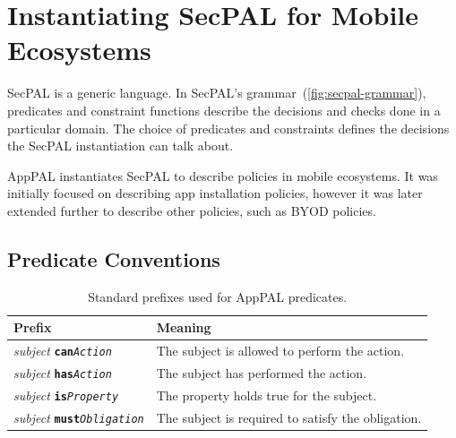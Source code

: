 \documentclass[thesis.tex]{subfiles}
\begin{document}
\section{Instantiating SecPAL for Mobile Ecosystems}
\label{sec:instantiating}

SecPAL is a generic language.  In SecPAL's
grammar~(\autoref{fig:secpal-grammar}), predicates and constraint
functions describe the decisions and checks done in a particular
domain.  The choice of predicates and constraints defines the
decisions the SecPAL instantiation can talk about.

AppPAL instantiates SecPAL to describe policies in mobile
ecosystems. It was initially focused on
describing app installation policies, however it was later extended
further to describe other policies, such as \ac{BYOD} policies.

\subsection{Predicate Conventions}
\label{ssec:predicate-conventions}

\newcommand{\descPred}[2]{\emph{subject} \texttt{\textbf{#1}\emph{#2}}}
\begin{table}\footnotesize\sffamily\centering
  \begin{tabular}{l l}
    \toprule
    Prefix                      & Meaning                                            \\
    \midrule
    \descPred{can}{Action}      & The subject is allowed to perform the action.      \\
    \descPred{has}{Action}      & The subject has performed the action.              \\
    \descPred{is}{Property}     & The property holds true for the subject.           \\
    \descPred{must}{Obligation} & The subject is required to satisfy the obligation. \\
    \bottomrule
  \end{tabular}
  \caption{Standard prefixes used for AppPAL predicates.}
  \label{tab:predicate-prefixes}
\end{table}
\end{document}
